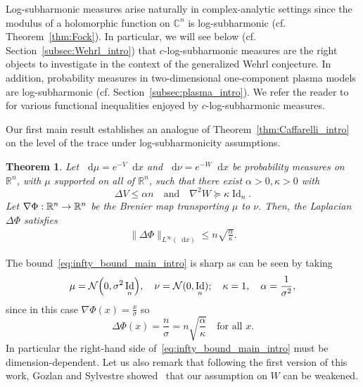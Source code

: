\documentclass[10pt]{amsart}
\newtheorem{theo}{Theorem}[section]
\theoremstyle{definition}\newtheorem{defi}[theo]{Definition}\newtheorem{rema}[theo]{Remark}\newtheorem{exam}[theo]{Example}\newtheorem{exem}[theo]{Example}\newtheorem{nota}[theo]{Notation}
\newcommand{\R}{\mathbb R}
\newcommand{\C}{\mathbb C}
\DeclareMathOperator{\Id}{Id}
\newcommand{\V}{V}
\newcommand{\W}{W}
\newcommand{\dd}{n}
\newcommand{\conv}{c}
\newcommand{\source}{\mu}
\newcommand{\target}{\nu}
\newcommand{\lsh}{\alpha}
\newcommand{\lc}{\kappa}
\newcommand*\diff{\mathop{}\!\mathrm{d}}
\newcommand{\clN}{\mathcal{N}}
\newcommand{\OT}{\Phi}
\renewcommand*{\to}{\mathchoice{\longrightarrow}{\rightarrow}{\rightarrow}{\rightarrow}}
\let\originalleft\left
\let\originalright\right
\renewcommand{\left}{\mathopen{}\mathclose\bgroup\originalleft}
\renewcommand{\right}{\aftergroup\egroup\originalright}
\begin{document}
Log-subharmonic measures arise naturally in complex-analytic settings since the modulus of a holomorphic function on $\C^{\dd}$ is log-subharmonic (cf. Theorem~\ref{thm:Fock}). In particular, we will see below (cf. Section~\ref{subsec:Wehrl_intro}) that $\conv$-log-subharmonic measures are the right objects to investigate in the context of the generalized Wehrl conjecture. In addition, probability measures in two-dimensional one-component plasma models are log-subharmonic (cf. Section~\ref{subsec:plasma_intro}). We refer the reader to~\cite{MR4632741,MR2134401, MR2578455, MR3415657} for various functional inequalities enjoyed by $\conv$-log-subharmonic measures.


Our first main result establishes an analogue of Theorem~\ref{thm:Caffarelli_intro} on the level of the trace under log-subharmonicity assumptions.

\begin{theo}\label{thm:main_OT_Lp_intro}
Let $\diff\source=e^{-\V}\diff x$ and $\diff\target=e^{-\W}\diff x$ be probability measures on~$\R^{\dd}$, with $\source$ supported on all of $\R^{\dd}$, such that there exist $\lsh>0,\lc>0$ with
\[
\Delta \V \le \lsh\dd \quad\text{and}\quad \nabla^2\W \succeq \lc \Id_{\dd}.
\]
Let $\nabla\OT:\R^{\dd}\to\R^{\dd}$ be the Brenier map transporting $\source$ to $\target$. Then, the Laplacian $\Delta\OT$ satisfies
\begin{align}\label{eq:infty_bound_main_intro}
\|\Delta\OT\|_{L^{\infty}(\diff x)}\le \dd\sqrt{ \frac{\lsh}{\lc}}.
\end{align}
\end{theo}


The bound~\eqref{eq:infty_bound_main_intro} is sharp as can be seen by taking
\[
\source=\clN\left(0,\sigma^2\Id_{\dd}\right),\quad \target=\clN(0,\Id_{\dd}); \quad \lc=1, \quad \lsh=\frac{1}{\sigma^2},
\]
since in this case $\nabla \OT(x)=\frac{x}{\sigma}$ so
\[
\Delta\OT(x)=\frac{\dd}{\sigma}=\dd\sqrt{\frac{\lsh}{\lc}}\quad \text{for all }x.
\]
In particular the right-hand side of~\eqref{eq:infty_bound_main_intro} must be dimension-dependent. Let us also remark that following the first version of this work, Gozlan and Sylvestre showed~\cite[\S 6]{gozlan2025global} that our assumption on $\W$ can be weakened.
\end{document}

